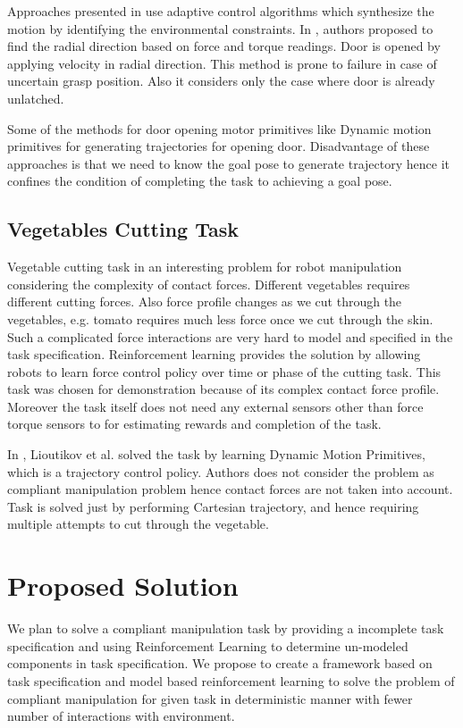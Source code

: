 \documentclass[thesis]{mas_proposal}
\begin{document}
Approaches presented in \cite{levihn2014using,karayiannidis2012adaptive,niemeyer1997simple} use adaptive control algorithms which synthesize the motion by identifying the environmental constraints. In \cite{karayiannidis2012adaptive}, authors proposed to find the radial direction based on force and torque readings. Door is opened by applying velocity in radial direction. This method is prone to failure in case of uncertain grasp position. Also it considers only the case where door is already unlatched. 

Some of the methods for door opening motor primitives like Dynamic motion primitives for generating trajectories for opening door. Disadvantage of these approaches is that we need to know the goal pose to generate trajectory hence it confines the condition of completing the task to achieving a goal pose. 

\section{Vegetables Cutting Task}
Vegetable cutting task in an interesting problem for robot manipulation considering the complexity of contact forces. Different vegetables requires different cutting forces. Also force profile changes as we cut through the vegetables, e.g. tomato requires much less force once we cut through the skin. Such a complicated force interactions are very hard to model and specified in the task specification. Reinforcement learning provides the solution by allowing robots to learn force control policy over time or phase of the cutting task. This task was chosen for demonstration because of its complex contact force profile. Moreover the task itself does not need any external sensors other than force torque sensors to for estimating rewards and completion of the task.

In \cite{lioutikov2016learning}, Lioutikov et al. solved the task by learning Dynamic Motion Primitives, which is a trajectory control policy. Authors does not consider the problem as compliant manipulation problem hence contact forces are not taken into account. Task is solved just by performing Cartesian trajectory, and hence requiring multiple attempts to cut through the vegetable. 


\chapter{Proposed Solution}

We plan to solve a compliant manipulation task by providing a incomplete task specification and using Reinforcement Learning to determine un-modeled components in task specification. We propose to create a framework based on task specification and model based reinforcement learning to solve the problem of compliant manipulation for given task in deterministic manner with fewer number of interactions with environment.
\end{document}
